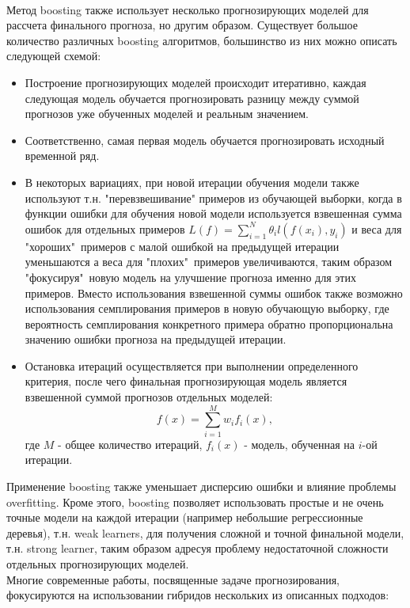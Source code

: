 \documentclass[11pt]{article}
\begin{document}
\\
Метод boosting также использует несколько прогнозирующих моделей для рассчета финального прогноза, но другим образом. Существует большое количество различных boosting алгоритмов, большинство из них можно описать следующей схемой:
\begin{itemize}
\item Построение прогнозирующих моделей происходит итеративно, каждая следующая модель обучается прогнозировать разницу между суммой прогнозов уже обученных моделей и реальным значением.
\item Соответственно, самая первая модель обучается прогнозировать исходный временной ряд.
\item В некоторых вариациях, при новой итерации обучения модели также используют т.н. "перевзвешивание" примеров из обучающей выборки, когда в функции ошибки для обучения новой модели используется взвешенная сумма ошибок для отдельных примеров $L(f) = \sum_{i=1}^{N}{\theta_il(f(x_i), y_i)}$ и веса для "хороших"\ примеров с малой ошибкой на предыдущей итерации уменьшаются а веса для "плохих"\ примеров увеличиваются, таким образом "фокусируя"\ новую модель на улучшение прогноза именно для этих примеров. Вместо использования взвешенной суммы ошибок также возможно использования семплирования примеров в новую обучающую выборку, где вероятность семплирования конкретного примера обратно пропорциональна значению ошибки прогноза на предыдущей итерации.
\item Остановка итераций осуществляется при выполнении определенного критерия, после чего финальная прогнозирующая модель является взвешенной суммой прогнозов отдельных моделей:
$$ f(x) = \sum_{i=1}^{M}{w_if_i(x)}, $$
где $M$ - общее количество итераций, $ f_i(x) $ - модель, обученная на $i$-ой итерации.
\end{itemize}
Применение boosting также уменьшает дисперсию ошибки и влияние проблемы overfitting. Кроме этого, boosting позволяет использовать простые и не очень точные модели на каждой итерации (например небольшие регрессионные деревья), т.н. weak learners, для получения сложной и точной финальной модели, т.н. strong learner, таким образом адресуя проблему недостаточной сложности отдельных прогнозирующих моделей.
\\
Многие современные работы, посвященные задаче прогнозирования, фокусируются на использовании гибридов нескольких из описанных подходов:
\end{document}
